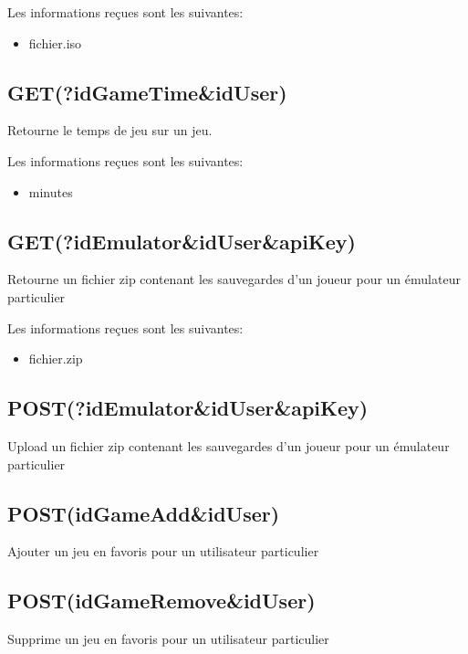 \documentclass[a4paper,12pt,french]{sphinxmanual}
\begin{document}
\sphinxAtStartPar
Les informations reçues sont les suivantes:
\begin{itemize}
\item {} 
\sphinxAtStartPar
fichier.iso

\end{itemize}


\subsection{GET(?idGameTime\&idUser)}
\label{\detokenize{fonctionnelle:get-idgametime-iduser}}
\sphinxAtStartPar
Retourne le temps de jeu sur un jeu.

\sphinxAtStartPar
Les informations reçues sont les suivantes:
\begin{itemize}
\item {} 
\sphinxAtStartPar
minutes

\end{itemize}


\subsection{GET(?idEmulator\&idUser\&apiKey)}
\label{\detokenize{fonctionnelle:get-idemulator-iduser-apikey}}
\sphinxAtStartPar
Retourne un fichier zip contenant les sauvegardes d’un joueur pour un émulateur particulier

\sphinxAtStartPar
Les informations reçues sont les suivantes:
\begin{itemize}
\item {} 
\sphinxAtStartPar
fichier.zip

\end{itemize}


\subsection{POST(?idEmulator\&idUser\&apiKey)}
\label{\detokenize{fonctionnelle:post-idemulator-iduser-apikey}}
\sphinxAtStartPar
Upload un fichier zip contenant les sauvegardes d’un joueur pour un émulateur particulier


\subsection{POST(idGameAdd\&idUser)}
\label{\detokenize{fonctionnelle:post-idgameadd-iduser}}
\sphinxAtStartPar
Ajouter un jeu en favoris pour un utilisateur particulier


\subsection{POST(idGameRemove\&idUser)}
\label{\detokenize{fonctionnelle:post-idgameremove-iduser}}
\sphinxAtStartPar
Supprime un jeu en favoris pour un utilisateur particulier
\end{document}
